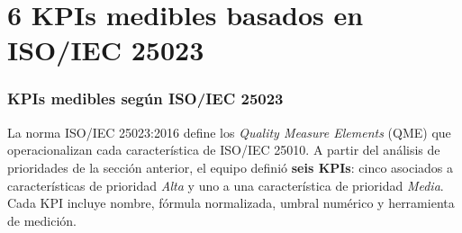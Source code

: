 \documentclass{report}
\begin{document}

\newpage
\chapter*{6 KPIs medibles basados en ISO/IEC 25023}

\subsection*{KPIs medibles según ISO/IEC 25023}
\label{sec:kpis}



La norma ISO/IEC 25023:2016 define los \textit{Quality Measure Elements} (QME)
que operacionalizan cada característica de ISO/IEC 25010. A partir del análisis
de prioridades de la sección anterior, el equipo definió \textbf{seis KPIs}:
cinco asociados a características de prioridad \textit{Alta} y uno a una
característica de prioridad \textit{Media}. Cada KPI incluye nombre, fórmula
normalizada, umbral numérico y herramienta de medición.
\end{document}

